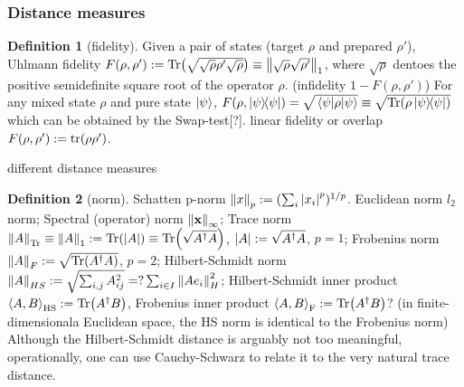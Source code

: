 \documentclass[
10pt,
aps,
pra,
linenumbers,
floatfix,
]{revtex4-2}
\theoremstyle{plain}
\theoremstyle{definition}
\newtheorem{definition}{Definition}
\newcommand{\dm}{\rho}
\begin{document}
\subsubsection{Distance measures}
\begin{definition}[fidelity]\label{def:fidelity}
	Given a pair of states (target $\dm$ and prepared $\dm'$), 
	Uhlmann fidelity $F(\dm,\dm') : = \Tr(\sqrt{\sqrt{\dm}\dm'\sqrt{\dm}})\equiv\norm{\sqrt{\dm}\sqrt{\dm'}}_1$, where $\sqrt{\dm}$ dentoes the positive semidefinite square root of the operator $\dm$. (infidelity $1-F(\dm,\dm')$)
	For any mixed state $\rho$ and pure state $\ket{\psi}$, $F(\dm,\op{\psi})=\sqrt{\mel{\psi}{\dm}{\psi}}\equiv \sqrt{\Tr(\dm\op{\psi})}$ which can be obtained by the Swap-test[?].
	linear fidelity or overlap $F(\dm,\dm'):=\tr(\dm\dm')$.
\end{definition}
different distance measures \cite{badescuQuantumStateCertification2017}
\begin{definition}[norm]\label{def:norm}
	Schatten p-norm $\norm{x}_p:= (\sum_i \abs{x_i}^p)^{1/p}$.
	Euclidean norm $l_2$ norm;
	Spectral (operator) norm $\norm{\vb{x}}_{\infty}$;
	Trace norm $\norm{A}_{\Tr}\equiv\norm{A}_{1}:=\Tr(\abs{A})\equiv\Tr(\sqrt{A^\dagger A})$, $\abs{A}:=\sqrt{A^\dagger A}$, $p=1$;
	Frobenius norm $\norm{A}_{F}:=\sqrt{\Tr(A^\dagger A)}$, $p=2$;
	Hilbert-Schmidt norm $\norm{A}_{HS}:=\sqrt{\sum_{i,j} A_{ij}^2 }=?\sum_{i\in I}\norm{Ae_i}_H^2$;
	Hilbert-Schmidt inner product $\expval{A,B}_{\textup{HS}}:=\Tr(A^\dagger B)$,
	Frobenius inner product $\expval{A,B}_{\textup{F}}:=\Tr(A^\dagger B)$?
	(in finite-dimensionala Euclidean space, the HS norm is identical to the Frobenius norm)
	Although the Hilbert-Schmidt distance is arguably not too meaningful, operationally, one can use Cauchy-Schwarz to relate it to the very natural trace distance.
\end{definition}
\end{document}
